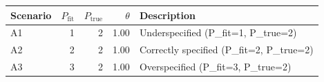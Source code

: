 \begin{tabular}{lrrrl}
  \hline
Scenario & $P_{\text{fit}}$ & $P_{\text{true}}$ & $\theta$ & Description \\ 
  \hline
A1 &   1 &   2 & 1.00 & Underspecified (P\_fit=1, P\_true=2) \\ 
  A2 &   2 &   2 & 1.00 & Correctly specified (P\_fit=2, P\_true=2) \\ 
  A3 &   3 &   2 & 1.00 & Overspecified (P\_fit=3, P\_true=2) \\ 
   \hline
\end{tabular}
